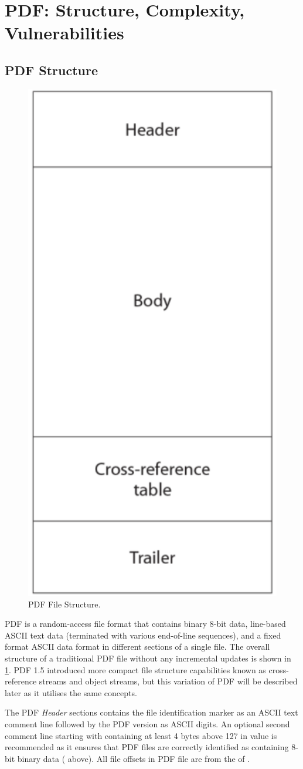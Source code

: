 \section{PDF: Structure, Complexity, Vulnerabilities}
\label{sec:pdf}

\subsection{PDF Structure}

\begin{figure}[t]
    \centering
    \includegraphics[width=0.35\linewidth]{figures/pdf-structure.png}
    \caption{PDF File Structure.}
    \label{fig:pdf-structure}
\end{figure}

PDF is a random-access file format that contains binary 8-bit data, line-based ASCII
text data (terminated with various end-of-line sequences), and a fixed format ASCII 
data format in different sections of a single file. The overall structure of a 
traditional PDF file without any incremental updates is shown in \cref{fig:pdf-structure}.
PDF 1.5 introduced more compact file structure capabilities known as cross-reference streams 
and object streams, but this variation of PDF will be described later as it utilises the same
concepts.

The PDF \emph{Header} sections contains the file identification marker as an ASCII
text comment line  followed by the PDF version as ASCII digits. 
An optional second comment line starting with \lstcd{\%}
containing at least 4 bytes above 127 in value is recommended as it ensures 
that PDF files are correctly identified as containing 8-bit binary data (\lstcd{\%\â\ã\Ï\Ó} above). 
All file offsets in PDF file are from the \lstcd{\%} of .  


